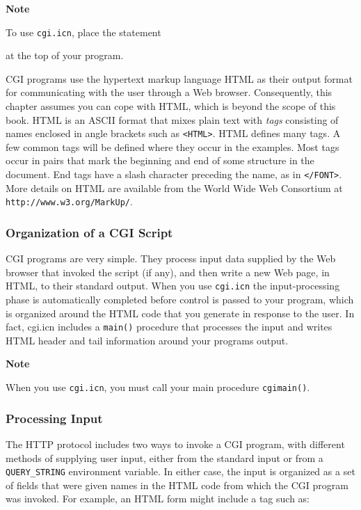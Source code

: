 {\sffamily\bfseries Note}

{\sffamily To use \texttt{cgi.icn}, place the statement


\noindent at the top of your program.

CGI programs use the hypertext markup language HTML as their output
format for communicating with the user through a Web browser.
Consequently, this chapter assumes you can cope with HTML, which is
beyond the scope of this book. HTML is an ASCII format that mixes plain
text with \textit{tags} consisting of names enclosed in angle brackets
such as \texttt{{\textless}HTML{\textgreater}}. HTML defines many tags.
A few common tags will be defined where they occur in the examples.
Most tags occur in pairs that mark the beginning and end of some
structure in the document. End tags have a slash character preceding
the name, as in \texttt{{\textless}/FONT{\textgreater}}. More details
on HTML are available from the World Wide Web Consortium at
\texttt{http://www.w3.org/MarkUp/}.

\subsubsection[Organization of a CGI Script]{Organization of a CGI
Script}
CGI programs are very simple. They process input data supplied by the
Web browser that invoked the script (if any), and then write a new Web
page, in HTML, to their standard output. When you use \texttt{cgi.icn}
the input-processing phase is automatically completed before control is
passed to your program, which is organized around the HTML code that
you generate in response to the user. In fact, cgi.icn includes a
\texttt{main()} procedure that processes the input and writes HTML
header and tail information around your program{\textquotesingle}s
output. 

{\sffamily\bfseries
Note}

{\sffamily
When you use \texttt{cgi.icn}, you must call your main procedure
\texttt{cgimain()}. }

\subsubsection{Processing Input}

The HTTP protocol includes two ways to invoke a CGI program,
with different methods of supplying user input, either from the
standard input or from a \texttt{QUERY\_STRING} environment variable.
In either case, the input is organized as a set of fields that were
given names in the HTML code from which the CGI program was invoked.
For example, an HTML form might include a tag such as: 

}
